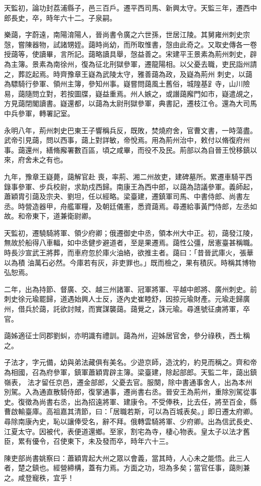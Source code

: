 \begin{pinyinscope}
 天監初，論功封荔浦縣子，邑三百戶。遷平西司馬、新興太守。天監三年，遷西中郎長史，卒，時年六十二。子泉嗣。



 樂藹，字蔚遠，南陽淯陽人，晉尚書令廣之六世孫，世居江陵。其舅雍州刺史宗愨，嘗陳器物，試諸甥姪。藹時尚幼，而所取惟書，愨由此奇之。又取史傳各一卷授藹等，使讀畢，言所記。藹略讀具舉，愨益善之。宋建平王景素為荊州刺史，辟為主簿。景素為南徐州，復為征北刑獄參軍，遷龍陽相。以父憂去職，吏民詣州請之，葬訖起焉。時齊豫章王嶷為武陵太守，雅善藹為政，及嶷為荊州
 刺史，以藹為驃騎行參軍、領州主簿，參知州事。嶷嘗問藹風土舊俗，城隍基𧾷寺，山川險易，藹隨問立對，若按圖牒，嶷益重焉。州人嫉之，或譖藹廨門如市，嶷遣覘之，方見藹閉閣讀書。嶷還都，以藹為太尉刑獄參軍，典書記，遷枝江令。還為大司馬中兵參軍，轉署記室。



 永明八年，荊州刺史巴東王子響稱兵反，既敗，焚燒府舍，官曹文書，一時蕩盡。武帝引見藹，問以西事，藹上對詳敏，帝悅焉。用為荊州治中，敕付以脩復府州事。藹還州，繕脩廨署數百區，頃之咸畢，而役不及民。荊部以為自晉王悅移鎮以來，府舍未之有也。



 九年，豫章王嶷薨，藹解官赴
 喪，率荊、湘二州故吏，建碑墓所。累遷車騎平西錄事參軍、步兵校尉，求助戍西歸。南康王為西中郎，以藹為諮議參軍。義師起，蕭穎胄引藹及宗夬、劉坦，任以經略。梁臺建，遷鎮軍司馬、中書侍郎、尚書左丞。時營造器甲，舟艦軍糧，及朝廷儀憲，悉資藹焉。尋遷給事黃門侍郎，左丞如故。和帝東下，道兼衛尉卿。



 天監初，遷驍騎將軍、領少府卿；俄遷御史中丞，領本州大中正。初，藹發江陵，無故於船得八車輻，如中丞健步避道者，至是果遷焉。藹性公彊，居憲臺甚稱職。時長沙宣武王將葬，而車府忽於庫火油絡，欲推主者。藹曰：「昔晉武庫火，張華以為積
 油萬石必然。今庫若有灰，非吏罪也。」既而檢之，果有積灰。時稱其博物弘恕焉。



 二年，出為持節、督廣、交、越三州諸軍、冠軍將軍、平越中郎將、廣州刺史。前刺史徐元瑜罷歸，道遇始興人士反，逐內史崔睦舒，因掠元瑜財產。元瑜走歸廣州，借兵於藹，託欲討賊，而實謀襲藹。藹覺之，誅元瑜。尋進號征虜將軍，卒官。



 藹姊適征士同郡劉虯，亦明識有禮訓。藹為州，迎姊居官舍，參分祿秩，西土稱之。



 子法才，字元備，幼與弟法藏俱有美名。少遊京師，造沈約，約見而稱之。齊和帝為相國，召為府參軍，鎮軍蕭穎胄辟主簿。梁臺建，除起部郎。天監二年，藹出鎮嶺表，
 法才留任京邑，遷金部郎，父憂去官。服闋，除中書通事舍人，出為本州別駕。入為通直散騎侍郎，復掌通事，遷尚書右丞。晉安王為荊州，重除別駕從事史。復徵為尚書右丞，出為招遠將軍、建康令。不受俸秩，比去任，將至百金，縣曹啟輸臺庫。高祖嘉其清節，曰：「居職若斯，可以為百城表矣。」即日遷太府卿。尋除南康內史，恥以讓俸受名，辭不拜。俄轉雲騎將軍、少府卿。出為信武長史、江夏太守。因被代，表便道還鄉。至家，割宅為寺，棲心物表。皇太子以法才舊臣，累有優令，召使東下，未及發而卒，時年六十三。



 陳吏部尚書姚察曰：蕭穎胄起大州之眾以會義，當其時，人心未之能悟。此三人者，楚之鎮也。經營締構，蓋有力焉。方面之功，坦為多矣；當官任事，藹則兼之。咸登寵秩，宜乎！



\end{pinyinscope}